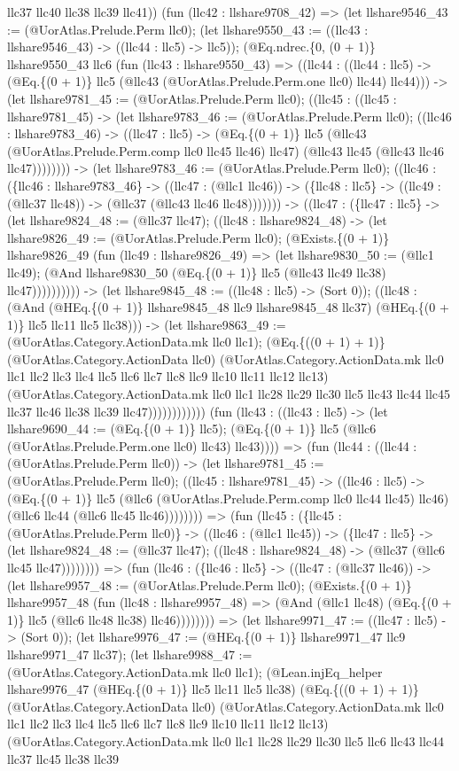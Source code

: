 \documentclass[11pt]{article}
\begin{document}
llc37 llc40 llc38 llc39 llc41)) (fun (llc42 : llshare9708\_42) => (let llshare9546\_43 := (@UorAtlas.Prelude.Perm llc0); (let llshare9550\_43 := ((llc43 : llshare9546\_43) -> ((llc44 : llc5) -> llc5)); (@Eq.ndrec.\{0, (0 + 1)\} llshare9550\_43 llc6 (fun (llc43 : llshare9550\_43) => ((llc44 : ((llc44 : llc5) -> (@Eq.\{(0 + 1)\} llc5 (@llc43 (@UorAtlas.Prelude.Perm.one llc0) llc44) llc44))) -> (let llshare9781\_45 := (@UorAtlas.Prelude.Perm llc0); ((llc45 : ((llc45 : llshare9781\_45) -> (let llshare9783\_46 := (@UorAtlas.Prelude.Perm llc0); ((llc46 : llshare9783\_46) -> ((llc47 : llc5) -> (@Eq.\{(0 + 1)\} llc5 (@llc43 (@UorAtlas.Prelude.Perm.comp llc0 llc45 llc46) llc47) (@llc43 llc45 (@llc43 llc46 llc47)))))))) -> (let llshare9783\_46 := (@UorAtlas.Prelude.Perm llc0); ((llc46 : (\{llc46 : llshare9783\_46\} -> ((llc47 : (@llc1 llc46)) -> (\{llc48 : llc5\} -> ((llc49 : (@llc37 llc48)) -> (@llc37 (@llc43 llc46 llc48))))))) -> ((llc47 : (\{llc47 : llc5\} -> (let llshare9824\_48 := (@llc37 llc47); ((llc48 : llshare9824\_48) -> (let llshare9826\_49 := (@UorAtlas.Prelude.Perm llc0); (@Exists.\{(0 + 1)\} llshare9826\_49 (fun (llc49 : llshare9826\_49) => (let llshare9830\_50 := (@llc1 llc49); (@And llshare9830\_50 (@Eq.\{(0 + 1)\} llc5 (@llc43 llc49 llc38) llc47)))))))))) -> (let llshare9845\_48 := ((llc48 : llc5) -> (Sort 0)); ((llc48 : (@And (@HEq.\{(0 + 1)\} llshare9845\_48 llc9 llshare9845\_48 llc37) (@HEq.\{(0 + 1)\} llc5 llc11 llc5 llc38))) -> (let llshare9863\_49 := (@UorAtlas.Category.ActionData.mk llc0 llc1); (@Eq.\{((0 + 1) + 1)\} (@UorAtlas.Category.ActionData llc0) (@UorAtlas.Category.ActionData.mk llc0 llc1 llc2 llc3 llc4 llc5 llc6 llc7 llc8 llc9 llc10 llc11 llc12 llc13) (@UorAtlas.Category.ActionData.mk llc0 llc1 llc28 llc29 llc30 llc5 llc43 llc44 llc45 llc37 llc46 llc38 llc39 llc47)))))))))))) (fun (llc43 : ((llc43 : llc5) -> (let llshare9690\_44 := (@Eq.\{(0 + 1)\} llc5); (@Eq.\{(0 + 1)\} llc5 (@llc6 (@UorAtlas.Prelude.Perm.one llc0) llc43) llc43)))) => (fun (llc44 : ((llc44 : (@UorAtlas.Prelude.Perm llc0)) -> (let llshare9781\_45 := (@UorAtlas.Prelude.Perm llc0); ((llc45 : llshare9781\_45) -> ((llc46 : llc5) -> (@Eq.\{(0 + 1)\} llc5 (@llc6 (@UorAtlas.Prelude.Perm.comp llc0 llc44 llc45) llc46) (@llc6 llc44 (@llc6 llc45 llc46)))))))) => (fun (llc45 : (\{llc45 : (@UorAtlas.Prelude.Perm llc0)\} -> ((llc46 : (@llc1 llc45)) -> (\{llc47 : llc5\} -> (let llshare9824\_48 := (@llc37 llc47); ((llc48 : llshare9824\_48) -> (@llc37 (@llc6 llc45 llc47)))))))) => (fun (llc46 : (\{llc46 : llc5\} -> ((llc47 : (@llc37 llc46)) -> (let llshare9957\_48 := (@UorAtlas.Prelude.Perm llc0); (@Exists.\{(0 + 1)\} llshare9957\_48 (fun (llc48 : llshare9957\_48) => (@And (@llc1 llc48) (@Eq.\{(0 + 1)\} llc5 (@llc6 llc48 llc38) llc46)))))))) => (let llshare9971\_47 := ((llc47 : llc5) -> (Sort 0)); (let llshare9976\_47 := (@HEq.\{(0 + 1)\} llshare9971\_47 llc9 llshare9971\_47 llc37); (let llshare9988\_47 := (@UorAtlas.Category.ActionData.mk llc0 llc1); (@Lean.injEq\_helper llshare9976\_47 (@HEq.\{(0 + 1)\} llc5 llc11 llc5 llc38) (@Eq.\{((0 + 1) + 1)\} (@UorAtlas.Category.ActionData llc0) (@UorAtlas.Category.ActionData.mk llc0 llc1 llc2 llc3 llc4 llc5 llc6 llc7 llc8 llc9 llc10 llc11 llc12 llc13) (@UorAtlas.Category.ActionData.mk llc0 llc1 llc28 llc29 llc30 llc5 llc6 llc43 llc44 llc37 llc45 llc38 llc39 
\end{document}
